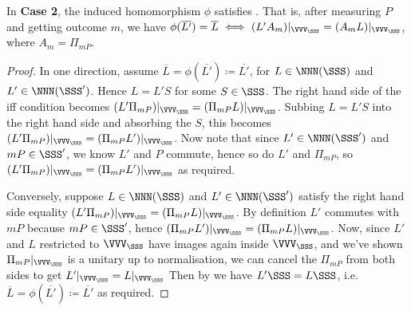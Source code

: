 \begin{proposition}
    In \textbf{Case 2}, the induced homomorphism $\phi$ satisfies .
    That is, after measuring $P$ and getting outcome $m$, we have $\phi(\overline{L'}) = \overline{L} \iff (L' A_m)|_{\VVV_\SSS} = (A_m L)|_{\VVV_\SSS}$, where $A_m = \Pi_{mP}$.
    \begin{proof}
        In one direction, assume $\overline{L} = \phi(\overline{L'}) \coloneqq \overline{L'}$, for $L \in \NNN(\SSS)$ and $L' \in \NNN(\SSS')$.
        Hence $L = L'S$ for some $S \in \SSS$.
        The right hand side of the iff condition becomes $(L' \Pi_{mP})|_{\VVV_\SSS} = (\Pi_{mP} L)|_{\VVV_\SSS}$.
        Subbing $L = L'S$ into the right hand side and absorbing the $S$, this becomes $(L' \Pi_{mP})|_{\VVV_\SSS} = (\Pi_{mP} L')|_{\VVV_\SSS}$.
        Now note that since $L' \in \NNN(\SSS')$ and $mP \in \SSS'$, we know $L'$ and $P$ commute, hence so do $L'$ and $\Pi_{mP}$, so $(L' \Pi_{mP})|_{\VVV_\SSS} = (\Pi_{mP} L')|_{\VVV_\SSS}$ as required.

        Conversely, suppose $L \in \NNN(\SSS)$ and $L' \in \NNN(\SSS')$ satisfy the right hand side equality $(L'
        \Pi_{mP})|_{\VVV_\SSS} = (\Pi_{mP} L)|_{\VVV_\SSS}$.
        By definition $L'$ commutes with $mP$ because $mP \in \SSS'$, hence $(\Pi_{mP} L')|_{\VVV_\SSS} = (\Pi_{mP} L)|_{\VVV_\SSS}$.
        Now, since $L'$ and $L$ restricted to $\VVV_\SSS$ have images again inside $\VVV_\SSS$, and we've shown $\Pi_{mP}|_{\VVV_\SSS}$ is a unitary up to normalisation, we can cancel the $\Pi_{mP}$ from both sides to get $L'|_{\VVV_\SSS} = L|_{\VVV_\SSS}$
        Then by  we have $L'\SSS = L\SSS$, i.e. $\overline{L} = \phi(\overline{L'}) \coloneqq \overline{L'}$ as required.
    \end{proof}
\end{proposition}

